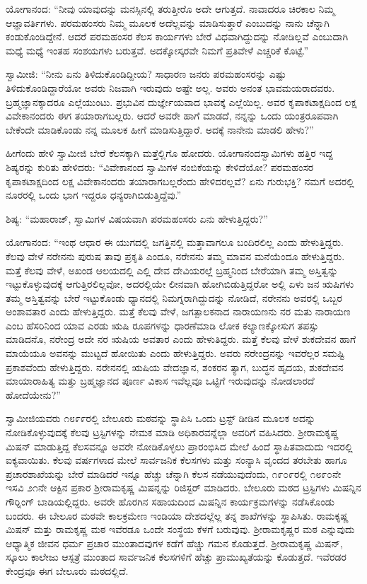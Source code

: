 ಯೋಗಾನಂದ: “ನೀವು ಯಾವುದನ್ನು ಮನಸ್ಸಿನಲ್ಲಿ ತರುತ್ತೀರೊ ಅದೇ ಆಗುತ್ತದೆ. ನಾವಾದರೂ ಚಿರಕಾಲ ನಿಮ್ಮ ಆಜ್ಞಾವರ್ತಿಗಳು. ಪರಮಹಂಸರು ನಿಮ್ಮ ಮೂಲಕ ಅದೆಲ್ಲವನ್ನು ಮಾಡಿಸುತ್ತಾರೆ ಎಂಬುದನ್ನು ನಾನು ಚೆನ್ನಾಗಿ ಕಂಡುಕೊಂಡಿದ್ದೇನೆ. ಆದರೆ ಪರಮಹಂಸರ ಕೆಲಸ ಕಾರ್ಯಗಳು ಬೇರೆ ವಿಧವಾಗಿದ್ದುದನ್ನು ನೋಡಿಲ್ಲವೆ ಎಂಬುದಾಗಿ ಮಧ್ಯೆ ಮಧ್ಯೆ ಇಂತಹ ಸಂಶಯಗಳು ಬರುತ್ತವೆ. ಅದಕ್ಕೋಸ್ಕರವೇ ನಿಮಗೆ ಪ್ರತಿವೇಳೆ ಎಚ್ಚರಿಕೆ ಕೊಟ್ಟೆ.” 

 ಸ್ವಾಮೀಜಿ: “ನೀನು ಏನು ತಿಳಿದುಕೊಂಡಿದ್ದೀಯ? ಸಾಧಾರಣ ಜನರು ಪರಮಹಂಸರನ್ನು ಎಷ್ಟು ತಿಳಿದುಕೊಂಡಿದ್ದಾರೆಯೋ ಅವರು ನಿಜವಾಗಿ ಇರುವುದು ಅಷ್ಟೇ ಅಲ್ಲ. ಅವರು ಅನಂತ ಭಾವಮಯರಾದವರು. ಬ್ರಹ್ಮಜ್ಞಾನಕ್ಕಾದರೂ ಎಲ್ಲೆಯುಂಟು. ಪ್ರಭುವಿನ ದುರ್ಜ್ಞೇಯವಾದ ಭಾವಕ್ಕೆ ಎಲ್ಲೆಯಿಲ್ಲ. ಅವರ ಕೃಪಾಕಟಾಕ್ಷದಿಂದ ಲಕ್ಷ ವಿವೇಕಾನಂದರು ಈಗ ತಯಾರಾಗಬಲ್ಲರು. ಆದರೆ ಅವರೇ ಹಾಗೆ ಮಾಡದೆ, ನನ್ನನ್ನು ಒಂದು ಯಂತ್ರರೂಪವಾಗಿ ಬೇಕೆಂದೇ ಮಾಡಿಕೊಂಡು ನನ್ನ ಮೂಲಕ ಹೀಗೆ ಮಾಡಿಸುತ್ತಿದ್ದಾರೆ. ಅದಕ್ಕೆ ನಾನೇನು ಮಾಡಲಿ ಹೇಳು?” 

 ಹೀಗೆಂದು ಹೇಳಿ ಸ್ವಾಮೀಜಿ ಬೇರೆ ಕೆಲಸಕ್ಕಾಗಿ ಮತ್ತೆಲ್ಲಿಗೊ ಹೋದರು. ಯೋಗಾನಂದಸ್ವಾಮಿಗಳು ಹತ್ತಿರ ಇದ್ದ ಶಿಷ್ಯರನ್ನು ಕುರಿತು ಹೇಳಿದರು: “ವಿವೇಕಾನಂದ ಸ್ವಾಮಿಗಳ ನಂಬಿಕೆಯನ್ನು ಕೇಳಿದೆಯೋ? ಪರಮಹಂಸರ ಕೃಪಾಕಟಾಕ್ಷದಿಂದ ಲಕ್ಷ ವಿವೇಕಾನಂದರು ತಯಾರಾಗಬಲ್ಲರೆಂದು ಹೇಳಿದರಲ್ಲವೆ? ಏನು ಗುರುಭಕ್ತಿ? ನಮಗೆ ಅದರಲ್ಲಿ ನೂರರಲ್ಲಿ ಒಂದು ಭಾಗ ಇದ್ದರೂ ಧನ್ಯರಾಗಿಬಿಡುತ್ತಿದ್ದೆವು.” 

 ಶಿಷ್ಯ: “ಮಹಾರಾಜ್, ಸ್ವಾಮಿಗಳ ವಿಷಯವಾಗಿ ಪರಮಹಂಸರು ಏನು ಹೇಳುತ್ತಿದ್ದರು?” 

 ಯೋಗಾನಂದ: “ಇಂಥ ಆಧಾರ ಈ ಯುಗದಲ್ಲಿ ಜಗತ್ತಿನಲ್ಲಿ ಮತ್ತಾವಾಗಲೂ ಬಂದಿರಲಿಲ್ಲ ಎಂದು ಹೇಳುತ್ತಿದ್ದರು. ಕೆಲವು ವೇಳೆ ನರೇನನು ಪುರುಷ ತಾವು ಪ್ರಕೃತಿ ಎಂದೂ, ನರೇನನು ತಮ್ಮ ಮಾವನ ಮನೆಯೆಂದೂ ಹೇಳುತ್ತಿದ್ದರು. ಮತ್ತೆ ಕೆಲವು ವೇಳೆ, ಅಖಂಡ ಆಲಯದಲ್ಲಿ ಎಲ್ಲಿ ದೇವ ದೇವಿಯರಲ್ಲೆ ಬ್ರಹ್ಮನಿಂದ ಬೇರೆಯಾಗಿ ತಮ್ಮ ಅಸ್ತಿತ್ವನ್ನು ಇಟ್ಟುಕೊಳ್ಳುವುದಕ್ಕೆ ಆಗುತ್ತಿರಲಿಲ್ಲವೋ, ಅದರಲ್ಲಿಯೇ ಲೀನವಾಗಿ ಹೋಗಿಬಿಡುತ್ತಿದ್ದರೋ ಅಲ್ಲಿ ಏಳು ಜನ ಋಷಿಗಳು ತಮ್ಮ ಅಸ್ತಿತ್ವವನ್ನು ಬೇರೆ ಇಟ್ಟುಕೊಂಡು ಧ್ಯಾನದಲ್ಲಿ ನಿಮಗ್ನರಾಗಿದ್ದುದನ್ನು ನೋಡಿದೆ, ನರೇನನು ಅವರಲ್ಲಿ ಒಬ್ಬರ ಅಂಶಾವತಾರ ಎಂದು ಹೇಳುತ್ತಿದ್ದರು. ಮತ್ತೆ ಕೆಲವು ವೇಳೆ, ಜಗತ್ಪಾಲಕನಾದ ನಾರಾಯಣನು ನರ ಮತು ನಾರಾಯಣ ಎಂಬ ಹೆಸರಿನಿಂದ ಯಾವ ಎರಡು ಋಷಿ ರೂಪಗಳನ್ನು ಧಾರಣೆಮಾಡಿ ಲೋಕ ಕಲ್ಯಾಣಕ್ಕೋಸುಗ ತಪಸ್ಸು ಮಾಡಿದನೊ, ನರೇಂದ್ರ ಅದೇ ನರ ಋಷಿಯ ಅವತಾರ ಎಂದು ಹೇಳುತಿದ್ದರು. ಮತ್ತೆ ಕೆಲವು ವೇಳೆ ಶುಕದೇವನ ಹಾಗೆ ಮಾಯೆಯೂ ಅವನನ್ನು ಮುಟ್ಟದೆ ಹೋಯಿತು ಎಂದು ಹೇಳುತ್ತಿದ್ದರು. ಅವರು ನರೇಂದ್ರನನ್ನು ಇವರೆಲ್ಲರ ಸಮಷ್ಟಿ ಪ್ರಕಾಶವೆಂದು ಹೇಳುತ್ತಿದ್ದರು. ನರೇನನಲ್ಲಿ ಋಷಿಯ ವೇದಜ್ಞಾನ, ಶಂಕರನ ತ್ಯಾಗ, ಬುದ್ಧನ ಹೃದಯ, ಶುಕದೇವನ ಮಾಯಾರಾಹಿತ್ಯ ಮತ್ತು ಬ್ರಹ್ಮಜ್ಞಾನದ ಪೂರ್ಣ ವಿಕಾಸ ಇವೆಲ್ಲವೂ ಒಟ್ಟಿಗೆ ಇರುವುದನ್ನು ನೋಡಲಾರದೆ ಹೋದೆಯೇನು?” 

 ಸ್ವಾಮೀಜಿಯವರು ೧೮೯೯ರಲ್ಲಿ ಬೇಲೂರು ಮಠವನ್ನು ಸ್ಥಾಪಿಸಿ ಒಂದು ಟ್ರಸ್ಟ್ ಡೀಡಿನ ಮೂಲಕ ಅದನ್ನು ನೋಡಿಕೊಳ್ಳುವುದಕ್ಕೆ ಕೆಲವು ಟ್ರಸ್ಟಿಗಳನ್ನು ನೇಮಕ ಮಾಡಿ ಅಧಿಕಾರವನ್ನೆಲ್ಲಾ ಅವರಿಗೆ ವಹಿಸಿದರು. ಶ‍್ರೀರಾಮಕೃಷ್ಣ ಮಿಷನ್ ಮಾಡುತ್ತಿದ್ದ ಕೆಲಸವನ್ನೂ ಅವರೇ ನೋಡಿಕೊಳ್ಳಲು ಪ್ರಾರಂಭಿಸಿದ ಮೇಲೆ ಹಿಂದೆ ಸ್ಥಾಪಿತವಾದುದು ಇದರಲ್ಲಿ ಐಕ್ಯವಾಯಿತು. ಕೆಲವು ವರ್ಷಗಳಾದ ಮೇಲೆ ಸಾರ್ವಜನಿಕ ಕೆಲಸಗಳು ಮತ್ತು ಸಂನ್ಯಾಸಿ ವೃಂದದ ತರಬೇತು ಹಾಗೂ ಪ್ರಚಾರಶಾಖೆಯನ್ನು ಬೇರೆ ಮಾಡಿದರೆ ಇನ್ನೂ ಹೆಚ್ಚು ಚೆನ್ನಾಗಿ ಕೆಲಸ ನಡೆಯುವುದೆಂದು, ೧೯೦೯ರಲ್ಲಿ ೧೮೯೦ನೇ ಇಸವಿ ೨೧ನೇ ಆಕ್ಟಿನ ಪ್ರಕಾರ ಶ‍್ರೀರಾಮಕೃಷ್ಣ ಮಿಷನ್ನನ್ನು ರಿಜಿಸ್ಟರ್ ಮಾಡಿದರು. ಬೇಲೂರು ಮಠದ ಟ್ರಸ್ಟಿಗಳು ಮಿಷನ್ನಿನ ಗೌರ‍್ನಿಂಗ್ ಬಾಡಿಯಲ್ಲಿದ್ದರು. ಅವರೇ ಹೊರಗಿನ ಸಹಾಯದಿಂದ ಮಿಷನ್ನಿನ ಕಾರ್ಯಕ್ರಮಗಳನ್ನು ನಡೆಸಿಕೊಂಡು ಬಂದರು. ಈ ಬೇಲೂರ ಮಠವೇ ಕಾಲಕ್ರಮೇಣ ಇಂಡಿಯಾ ದೇಶದಲ್ಲೆಲ್ಲ ತನ್ನ ಶಾಖೆಗಳನ್ನು ಸ್ಥಾಪಿಸಿತು. ರಾಮಕೃಷ್ಣ ಮಿಷನ್ ಮತ್ತು ರಾಮಕೃಷ್ಣ ಮಠ ಇವೆರಡೂ ಒಂದೇ ಸಂಸ್ಥೆಯ ಕೆಳಗೆ ಬರುವುವು. ಶ‍್ರೀರಾಮಕೃಷ್ಣರ ಮಠ ಎನ್ನುವುದು ಆಧ್ಯಾತ್ಮಿಕ ಜೀವನ ಧರ್ಮ ಪ್ರಚಾರ ಮುಂತಾದವುಗಳ ಕಡೆಗೆ ಹೆಚ್ಚು ಗಮನ ಕೊಡುತ್ತದೆ. ಶ‍್ರೀರಾಮಕೃಷ್ಣ ಮಿಷನ್, ಸ್ಕೂಲು ಕಾಲೇಜು ಆಸ್ಪತ್ರೆ ಮುಂತಾದ ಸಾರ್ವಜನಿಕ ಕೆಲಸಗಳಿಗೆ ಹೆಚ್ಚು ಪ್ರಾಮುಖ್ಯತೆಯನ್ನು ಕೊಡುತ್ತದೆ. ಇವೆರಡರ ಕೇಂದ್ರವೂ ಈಗ ಬೇಲೂರು ಮಠದಲ್ಲಿದೆ. 

